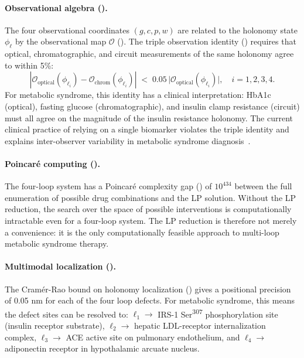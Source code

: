 \paragraph{Observational algebra ().}
The four observational coordinates $(g, c, p, w)$ are related to the
holonomy state $\phi_\ell$ by the observational map $\mathcal{O}$
().  The triple observation identity
() requires that optical, chromatographic, and
circuit measurements of the same holonomy agree to within 5\%:
\[
  \left| \mathcal{O}_{\mathrm{optical}}(\phi_{\ell_i})
       - \mathcal{O}_{\mathrm{chrom}}(\phi_{\ell_i}) \right|
  \;<\; 0.05\,\bigl|\mathcal{O}_{\mathrm{optical}}(\phi_{\ell_i})\bigr|,
  \quad i = 1,2,3,4.
\]
For metabolic syndrome, this identity has a clinical interpretation: HbA1c
(optical), fasting glucose (chromatographic), and insulin clamp resistance
(circuit) must all agree on the magnitude of the insulin resistance holonomy.
The current clinical practice of relying on a single biomarker violates the
triple identity and explains inter-observer variability in metabolic syndrome
diagnosis~\citep{Grundy2005}.

\paragraph{Poincaré computing ().}
The four-loop system has a Poincaré complexity gap ()
of $10^{434}$ between the full enumeration of possible drug combinations and
the LP solution.  Without the LP reduction, the search over the space of
possible interventions is computationally intractable even for a four-loop
system.  The LP reduction is therefore not merely a convenience: it is the
only computationally feasible approach to multi-loop metabolic syndrome therapy.

\paragraph{Multimodal localization ().}
The Cramér-Rao bound on holonomy localization () gives
a positional precision of 0.05 nm for each of the four loop defects.  For
metabolic syndrome, this means the defect sites can be resolved to:
$\ell_1 \to$ IRS-1 Ser\textsuperscript{307} phosphorylation site (insulin
receptor substrate), $\ell_2 \to$ hepatic LDL-receptor internalization
complex, $\ell_3 \to$ ACE active site on pulmonary endothelium, and
$\ell_4 \to$ adiponectin receptor in hypothalamic arcuate nucleus.

